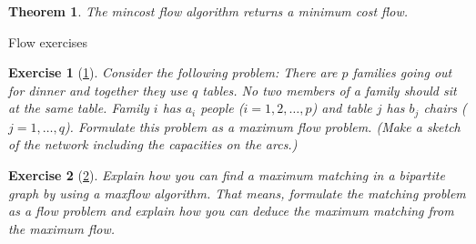 \documentclass[10pt]{report}
\makeatletter
\numberwithin{dummy}{section}
\theoremstyle{ocrenumbox}
\newtheorem{definitionT}{Exercise}[]
\newtheorem{definitionTTT}{Theorem}[]
\theoremstyle{grayman}
\newenvironment{exo}{\begin{dBox}\begin{definitionT}}{\end{definitionT}\end{dBox}}
\newenvironment{thm}{\begin{tBox}\begin{definitionTTT}}{\end{definitionTTT}\end{tBox}}
\renewcommand{\subsection}{\@startsection {subsection}{2}{\z@}
{-3ex \@plus -0.1ex \@minus -.4ex}
{0.5ex \@plus.2ex }
{\normalfont\sffamily\bfseries}}
\makeatother
\begin{document}
\begin{thm}
    The mincost flow algorithm returns a minimum cost flow.
\end{thm}

\subsection{Flow exercises}
\begin{exo}[\hypertarget{exo1}{\hyperlink{sol1}{1}}] 
Consider the following problem: There are $p$ families going out
for dinner and together they use $q$ tables. No two members of a family
should sit at the same table. Family $i$ has $a_i$ people ($i = 1, 2, \dots , p$) and
table $j$ has $b_j$ chairs ($j = 1, \dots , q$). Formulate this problem as a maximum flow problem. (Make a sketch of the network including the capacities on the arcs.)
\end{exo} 
 
\begin{exo}[\hypertarget{exo2}{\hyperlink{sol2}{2}}] 
Explain how you can find a maximum matching in a bipartite
graph by using a maxflow algorithm. That means, formulate the matching problem as a flow problem and explain how you can deduce the maximum matching from the maximum flow.
\end{exo} 
\end{document}
